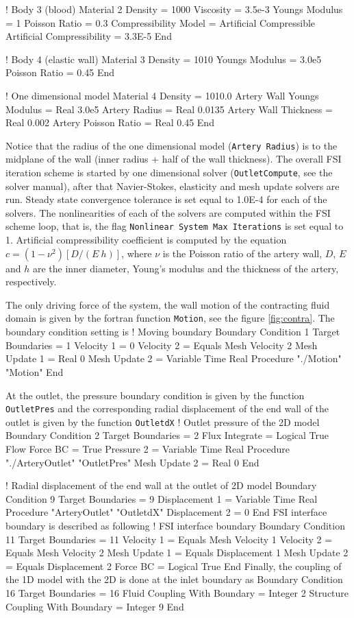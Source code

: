 ! Body 3 (blood)
Material 2
  Density = 1000
  Viscosity = 3.5e-3
  Youngs Modulus = 1
  Poisson Ratio = 0.3
  Compressibility Model = Artificial Compressible
  Artificial Compressibility  = 3.3E-5 
End

! Body 4 (elastic wall)
Material 3
  Density = 1010
  Youngs Modulus = 3.0e5
  Poisson Ratio = 0.45
End

! One dimensional model
Material 4
   Density = 1010.0
   Artery Wall Youngs Modulus = Real 3.0e5 
   Artery Radius = Real 0.0135 
   Artery Wall Thickness = Real 0.002
   Artery Poisson Ratio  = Real 0.45
End
\ttend

Notice that the radius of the one dimensional model ({\tt Artery Radius})
is to the midplane of the wall (inner radius + half of the wall thickness).
The overall FSI iteration scheme is started by one dimensional solver
({\tt OutletCompute}, see the solver manual), after that Navier-Stokes, 
elasticity and mesh update solvers are run.  Steady state convergence tolerance
is set equal to 1.0E-4 for each of the solvers.  The nonlinearities
of each of the solvers are computed within the FSI scheme loop, that is,
the flag {\tt Nonlinear System Max Iterations} is set equal to 1.
Artificial compressibility coefficient is computed by the equation
$c = (1-\nu^2) [D/(E~h)]$, where $\nu$ is the Poisson ratio of the
artery wall, $D$, $E$ and $h$ are the inner diameter, Young's modulus
and the thickness of the artery, respectively.

The only driving force of the system, the wall motion of the contracting 
fluid domain is given by the fortran function {\tt Motion}, see the
figure \ref{fig:contra}.  The boundary condition setting is
\ttbegin
! Moving boundary
Boundary Condition 1
  Target Boundaries = 1
  Velocity 1 = 0
  Velocity 2 = Equals Mesh Velocity 2
  Mesh Update 1 = Real 0
  Mesh Update 2 = Variable Time
       Real Procedure "./Motion" "Motion"
End
\ttend

At the outlet, the pressure boundary condition is given by the
function {\tt OutletPres} and the corresponding radial displacement
of the end wall of the outlet is given by the function {\tt OutletdX}
\ttbegin
! Outlet pressure of the 2D model
Boundary Condition 2
  Target Boundaries = 2
  Flux Integrate = Logical True
  Flow Force BC = True
  Pressure 2 = Variable Time
      Real Procedure "./ArteryOutlet" "OutletPres"
  Mesh Update 2 = Real 0
End

! Radial displacement of the end wall at the outlet of 2D model
Boundary Condition 9
  Target Boundaries = 9
  Displacement 1 = Variable Time
      Real Procedure "ArteryOutlet" "OutletdX"
  Displacement 2 = 0 
End
\ttend
FSI interface boundary is described as following
\ttbegin
! FSI interface boundary
Boundary Condition 11
  Target Boundaries = 11
  Velocity 1 = Equals Mesh Velocity 1
  Velocity 2 = Equals Mesh Velocity 2
  Mesh Update 1 = Equals Displacement 1
  Mesh Update 2 = Equals Displacement 2
  Force BC = Logical True
End
\ttend
Finally, the coupling of the 1D model with the 2D is 
done at the inlet boundary as
\ttbegin
Boundary Condition 16
  Target Boundaries = 16
  Fluid Coupling With Boundary = Integer 2
  Structure Coupling With Boundary = Integer 9
End
\ttend


